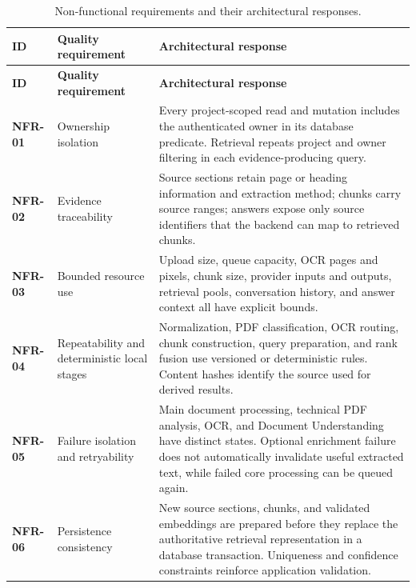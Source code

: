 {\small
\begin{longtable}{@{}L{1.2cm}L{5.2cm}L{7.3cm}@{}}
\caption[Non-functional requirements]{Non-functional requirements and their architectural responses.}
\label{tab:nonfunctional-requirements}\\
\toprule
\textbf{ID} & \textbf{Quality requirement} & \textbf{Architectural response} \\
\midrule
\endfirsthead
\toprule
\textbf{ID} & \textbf{Quality requirement} & \textbf{Architectural response} \\
\midrule
\endhead
\bottomrule
\endfoot
\textbf{NFR-01} &
Ownership isolation &
Every project-scoped read and mutation includes the authenticated owner in its
database predicate. Retrieval repeats project and owner filtering in each
evidence-producing query. \\

\textbf{NFR-02} &
Evidence traceability &
Source sections retain page or heading information and extraction method;
chunks carry source ranges; answers expose only source identifiers that the
backend can map to retrieved chunks. \\

\textbf{NFR-03} &
Bounded resource use &
Upload size, queue capacity, OCR pages and pixels, chunk size, provider inputs
and outputs, retrieval pools, conversation history, and answer context all have
explicit bounds. \\

\textbf{NFR-04} &
Repeatability and deterministic local stages &
Normalization, PDF classification, OCR routing, chunk construction, query
preparation, and rank fusion use versioned or deterministic rules. Content
hashes identify the source used for derived results. \\

\textbf{NFR-05} &
Failure isolation and retryability &
Main document processing, technical PDF analysis, OCR, and Document
Understanding have distinct states. Optional enrichment failure does not
automatically invalidate useful extracted text, while failed core processing
can be queued again. \\

\textbf{NFR-06} &
Persistence consistency &
New source sections, chunks, and validated embeddings are prepared before they
replace the authoritative retrieval representation in a database transaction.
Uniqueness and confidence constraints reinforce application validation. \\


\end{longtable}}
